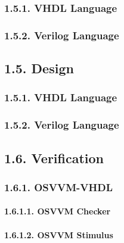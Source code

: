 \documentclass[
]{article}
\begin{document}
\hypertarget{vhdl-language-4}{%
\subsubsection{1.5.1. VHDL Language}\label{vhdl-language-4}}

\hypertarget{verilog-language-4}{%
\subsubsection{1.5.2. Verilog Language}\label{verilog-language-4}}

\hypertarget{design-1}{%
\subsection{1.5. Design}\label{design-1}}

\hypertarget{vhdl-language-5}{%
\subsubsection{1.5.1. VHDL Language}\label{vhdl-language-5}}

\hypertarget{verilog-language-5}{%
\subsubsection{1.5.2. Verilog Language}\label{verilog-language-5}}

\hypertarget{verification-1}{%
\subsection{1.6. Verification}\label{verification-1}}

\hypertarget{osvvm-vhdl-1}{%
\subsubsection{1.6.1. OSVVM-VHDL}\label{osvvm-vhdl-1}}

\hypertarget{osvvm-checker-1}{%
\paragraph{1.6.1.1. OSVVM Checker}\label{osvvm-checker-1}}

\hypertarget{osvvm-stimulus-1}{%
\paragraph{1.6.1.2. OSVVM Stimulus}\label{osvvm-stimulus-1}}
\end{document}
